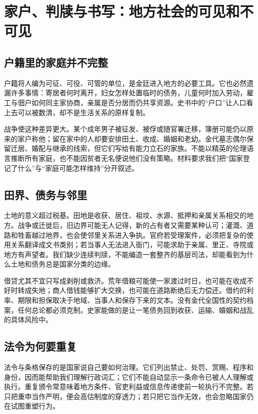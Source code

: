 \section{家户、判牍与书写：地方社会的可见和不可见}

\subsection{户籍里的家庭并不完整}

户籍将人编为可征、可役、可管的单位，是金廷进入地方的必要工具。它也必然遗漏许多事情：寄居者何时离开，妇女怎样处置临时的债务，儿童何时加入劳动，雇工与佃户如何同主家协商，亲属是否分居而仍共享资源。史书中的“户口”让人口看上去可以被数清，却不是生活关系的原样复制。

战争使这种差异更大。某个成年男子被征发、被俘或随官署迁移，簿册可能仍以原来的家户称他；留在家中的人却要安排田土、收成、婚姻和老幼。金代墓志偶尔保留迁居、婚配与继承的线索，但它们写给有能力立石的家族。不能以精英的伦理语言推断所有家庭，也不能因贫者无名便说他们没有策略。材料要求我们把“国家登记了什么”与“家庭可能怎样维持”分开叙述。

\subsection{田界、债务与邻里}

土地的意义超过税基。田地是收获、居住、祖坟、水源、抵押和亲属关系相交的地方。战争或迁徙后，旧边界可能无人记得，新的占有者又需要某种认可；灌溉、道路和牲畜越过地界，也会使邻里关系进入争执。官府若受理案件，必须把复杂的使用关系翻译成文书类别；若当事人无法进入衙门，可能求助于亲属、里正、寺院或地方有声望者。我们缺少连续判牍，不能编造一套整齐的基层司法，却能看到为什么土地和债务总是国家分类的边缘。

借贷尤其不宜只写成剥削或救济。荒年借粮可能使一家渡过时日，也可能在收成不好时转成失地；商人借钱能够扩大交换，也可能在道路断绝后无力偿还。借约的利率、期限和担保取决于地域、当事人和保存下来的文本。没有金代全国性的契约档案，任何总论都必须克制。史家能做的是让一笔债务回到收获、运输、婚姻和战乱的具体风险中。

\subsection{法令为何要重复}

法令与条格保存的是国家说自己要如何治理。它们列出禁止、处罚、赏赐、程序和身份，因而能帮助我们理解行政词汇；它们不能自动显示一条命令已被人人理解或执行。重复颁令常意味着地方条件、官吏利益或信息传递使前一轮执行不完整。若只把重申当作严明，便会高估制度的穿透力；若只把它当作无效，也会忽略国家仍在试图重塑行为。

